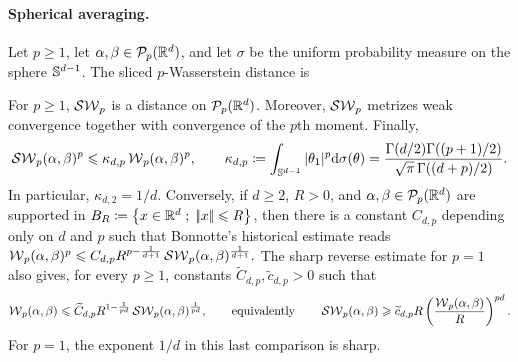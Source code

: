 \paragraph{Spherical averaging.}
\begin{defn}\label{def-sliced-wasserstein}
Let $p\geq1$, let $\alpha,\beta\in\mathcal{P}_p(\mathbb{R}^d)$, and let $\sigma$ be the uniform probability measure on the sphere $\mathbb{S}^{d-1}$. The sliced $p$-Wasserstein distance is
\end{defn}
\begin{prop}\label{prop-sliced-wasserstein-metric}
For $p\geq1$, $\operatorname{\mathcal{SW}}_p$ is a distance on $\mathcal{P}_p(\mathbb{R}^d)$. Moreover, $\operatorname{\mathcal{SW}}_p$ metrizes weak convergence together with convergence of the $p$th moment. Finally,
\[
\operatorname{\mathcal{SW}}_p(\alpha,\beta)^p
\leqslant
\kappa_{d,p}\operatorname{\mathcal{W}}_p(\alpha,\beta)^p,
\qquad
\kappa_{d,p}
\coloneqq
\int_{\mathbb{S}^{d-1}}|\theta_1|^p\mathrm{d}\sigma(\theta)
=
\frac{\Gamma(d/2)\Gamma((p+1)/2)}{\sqrt{\pi}\,\Gamma((d+p)/2)}.
\]
In particular, $\kappa_{d,2}=1/d$. Conversely, if $d\geq2$, $R>0$, and $\alpha,\beta\in\mathcal{P}_p(\mathbb{R}^d)$ are supported in
\(B_R\coloneqq\left\{ x\in\mathbb{R}^d \;;\; |\!| x |\!|\leqslant R \right\}\), then there is a constant
$C_{d,p}$ depending only on $d$ and $p$ such that Bonnotte's historical estimate reads \(\operatorname{\mathcal{W}}_p(\alpha,\beta)^p \leqslant C_{d,p}R^{p-\frac{1}{d+1}} \operatorname{\mathcal{SW}}_p(\alpha,\beta)^{\frac{1}{d+1}}.\)
The sharp reverse estimate for $p=1$ also gives, for every $p\geq1$, constants $\widetilde C_{d,p},\widetilde c_{d,p}>0$ such that
\[
\operatorname{\mathcal{W}}_p(\alpha,\beta)
\leqslant
\widetilde C_{d,p}
R^{1-\frac{1}{pd}}
\operatorname{\mathcal{SW}}_p(\alpha,\beta)^{\frac{1}{pd}},
\qquad\text{equivalently}\qquad
\operatorname{\mathcal{SW}}_p(\alpha,\beta)
\geqslant
\widetilde c_{d,p}R
\left(\frac{\operatorname{\mathcal{W}}_p(\alpha,\beta)}{R}\right)^{pd}.
\]
For $p=1$, the exponent $1/d$ in this last comparison is sharp.
\end{prop}

